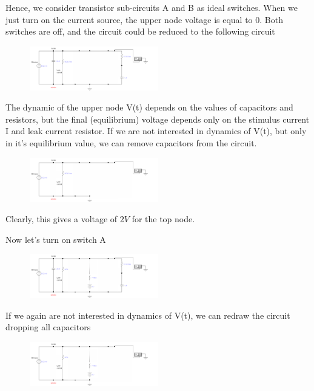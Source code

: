\documentclass[12]{amsbook}
\newcommand\0{\mathbf{0}}
\newcommand\<{\langle}
\renewcommand\>{\rangle}
\begin{document}
Hence, we consider transistor sub-circuits A and B as ideal switches. When we just turn on the current source, the upper node voltage is equal to 0. Both switches are off, and the circuit could be reduced to the following circuit
 
 \begin{figure}[H]
\includegraphics[width=0.5\textwidth]{exercise1-1}
\end{figure}

The dynamic of the upper node V(t) depends on the values of capacitors and resistors, but the final (equilibrium) voltage depends only on the stimulus current I and leak current resistor. If we are not interested in dynamics of V(t), but only in it’s equilibrium value, we can remove capacitors from the circuit.
 
 \begin{figure}[H]
\includegraphics[width=0.5\textwidth]{exercise1-2}
\end{figure}

Clearly, this gives a voltage of $2V$ for the top node.

Now let’s turn on switch A
 
 \begin{figure}[H]
\includegraphics[width=0.5\textwidth]{exercise1-3}
\end{figure}

If we again are not interested in dynamics of V(t), we can redraw the circuit dropping all capacitors
 
 \begin{figure}[H]
\includegraphics[width=0.5\textwidth]{exercise1-4}
\end{figure}
\end{document}
